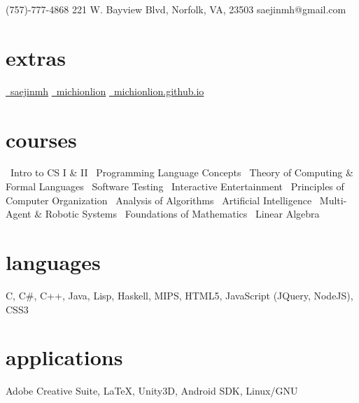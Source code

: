 \documentclass[]{friggeri-cv}
\begin{document}
       {\faMobilePhone\hspace{1mm}(757)-777-4868 \hspace{1cm} 221 W. Bayview Blvd, Norfolk, VA, 23503 \hspace{1.5cm} \faEnvelope\hspace{1.5mm}saejinmh@gmail.com}

\begin{aside}
  \section{extras}
    \href{https://www.linkedin.com/in/saejinmh}{\faLinkedin\ saejinmh}\vspace{0.03cm}
    \href{https://github.com/Michionlion}{\faGithub\ michionlion}\vspace{0.03cm}
    \href{https://michionlion.github.io}{\faGlobe\ michionlion.github.io}\vspace{0.03cm}
  \section{courses}
	\bullet\ Intro to CS I \& II\vspace{0.1cm}
	\bullet\ Programming Language Concepts\vspace{0.1cm}
	\bullet\ Theory of Computing \& Formal Languages\vspace{0.1cm}	
	\bullet\ Software Testing\vspace{0.1cm}
	\bullet\ Interactive Entertainment\vspace{0.1cm}
	\bullet\ Principles of Computer Organization\vspace{0.1cm}
    \bullet\ Analysis of Algorithms\vspace{0.1cm}
    \bullet\ Artificial Intelligence\vspace{0.1cm}
    \bullet\ Multi-Agent \& Robotic Systems\vspace{0.1cm}
    \bullet\ Foundations of Mathematics\vspace{0.1cm}
    \bullet\ Linear Algebra\vspace{0.1cm}
  \section{languages}
    C, C\#, C++, Java, Lisp, Haskell, MIPS, HTML5, JavaScript (JQuery, NodeJS), CSS3\vspace{0.1cm}
  \section{applications}
    Adobe Creative Suite, \LaTeX , Unity3D, Android SDK, Linux/GNU

\end{aside}
\end{document}
